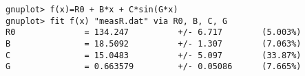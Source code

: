 \begin{lstlisting}[language=Gnuplot, basicstyle=\small\ttfamily, frame=single,
  float=htb, caption={Data fitting in gnuplot --- with the non-linear
formula}, label={lst:nlfit}]
gnuplot> f(x)=R0 + B*x + C*sin(G*x)
gnuplot> fit f(x) "measR.dat" via R0, B, C, G
R0              = 134.247          +/- 6.717        (5.003%)
B               = 18.5092          +/- 1.307        (7.063%)
C               = 15.0483          +/- 5.097        (33.87%)
G               = 0.663579         +/- 0.05086      (7.665%)
\end{lstlisting}
